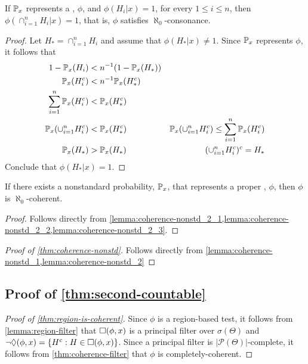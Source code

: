 \begin{lemma}
 \label{lemma:coherence-nonstd_2_3}
 If $\P_x$ represents a \summ, $\phi$, and
 $\phi(H_i|x) = 1$, for every $1 \leq i \leq n$,
 then $\phi(\cap_{i=1}^n H_i|x) = 1$, that is,
 $\phi$ satisfies $\aleph_0$-consonance.
\end{lemma}

\begin{proof} 
 Let $H_* = \cap_{i=1}^n H_i$ and
 assume that $\phi(H_*|x) \neq 1$.
 Since $\P_x$ represents $\phi$, 
 it follows that
 \begin{align*}
  1-\P_x(H_i) &< n^{-1}(1 - \P_x(H_*)) 
  \nonumber \\
  \P_x(H_i^c) &< n^{-1} \P_x(H_*^c) 
  \nonumber \\
  \sum_{i=1}^n \P_x(H_i^c)
  &< \P_x(H_*^c) 
  \nonumber \\
  \P_x(\cup_{i=1}^n H_i^c)
  &< \P_x(H_*^c) 
  & \P_x(\cup_{i=1}^n H_i^c) 
  \leq \sum_{i=1}^n \P_x(H_i^c) 
  \nonumber \\
  \P_x(H_*)
  &> \P_x(H_*)
  & (\cup_{i=1}^n H_i^c)^c = H_*
 \end{align*}
 Conclude that $\phi(H_*|x) = 1$.
\end{proof}

\begin{lemma}
 \label{lemma:coherence-nonstd_2}
 If there exists a nonstandard probability,
 $\P_x$, that represents a
 proper \summ, $\phi$, then
 $\phi$ is $\aleph_0$-coherent.
\end{lemma}

\begin{proof}
 Follows directly from
 \cref{lemma:coherence-nonstd_2_1,lemma:coherence-nonstd_2_2,lemma:coherence-nonstd_2_3}.
\end{proof}

\begin{proof}[Proof of \cref{thm:coherence-nonstd}]
 Follows directly from
 \cref{lemma:coherence-nonstd_1,lemma:coherence-nonstd_2}
\end{proof}

\subsection{Proof of \cref{thm:second-countable}}

\begin{proof}[Proof of \cref{thm:region-is-coherent}]
 Since $\phi$ is a region-based test, it follows from \cref{lemma:region-filter} that $\AA(\phix)$ is a principal filter over $\sigma(\Theta)$ and $\RR(\phix) = \{H^c: H \in \AA(\phix)\}$. Since a principal filter is $|\mathcal{P}(\Theta)|$-complete, it follows from  \cref{thm:coherence-filter} that $\phi$ is completely-coherent.
\end{proof}

